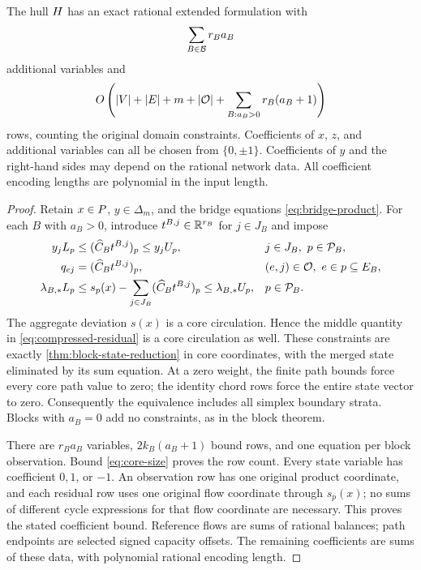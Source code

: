 \begin{theorem}\label{thm:cycle-compression}
The hull $H$ has an exact rational extended formulation with
\begin{equation}\label{eq:initial-variable-count}
 \sum_{B\in\mathcal B}r_Ba_B
\end{equation}
additional variables and
\begin{equation}\label{eq:compression-row-count}
 O\left(|V|+|E|+m+|\mathcal O|
       +\sum_{B:a_B>0}r_B(a_B+1)\right)
\end{equation}
rows, counting the original domain constraints. Coefficients of $x$, $z$,
and additional variables can all be chosen from $\{0,\pm1\}$. Coefficients
of $y$ and the right-hand sides may depend on the rational network data.
All coefficient encoding lengths are polynomial in the input length.
\end{theorem}
\begin{proof}
Retain $x\in P$, $y\in\Delta_m$, and the bridge equations
\eqref{eq:bridge-product}. For each $B$ with $a_B>0$, introduce
$t^{B,j}\in\mathbb R^{r_B}$ for $j\in J_B$ and impose
\begin{align}
 y_jL_p&\le(\widehat C_Bt^{B,j})_p\le y_jU_p,
       &&j\in J_B,\ p\in\mathcal P_B,\label{eq:compressed-state}\\
 q_{ej}&=(\widehat C_Bt^{B,j})_p,
       &&(e,j)\in\mathcal O,\ e\in p\subseteq E_B,\label{eq:compressed-observation}\\
 \lambda_{B,*}L_p&\le s_p(x)-\sum_{j\in J_B}
                      (\widehat C_Bt^{B,j})_p
                    \le\lambda_{B,*}U_p,
       &&p\in\mathcal P_B.\label{eq:compressed-residual}
\end{align}
The aggregate deviation $s(x)$ is a core circulation. Hence the middle
quantity in \eqref{eq:compressed-residual} is a core circulation as well.
These constraints are exactly \cref{thm:block-state-reduction} in core
coordinates, with the merged state eliminated by its sum equation.
At a zero weight, the finite path bounds force every core path value to
zero; the identity chord rows force the entire state vector to zero.
Consequently the equivalence includes all simplex boundary strata. Blocks
with $a_B=0$ add no constraints, as in the block theorem.

There are $r_Ba_B$ variables, $2k_B(a_B+1)$ bound rows, and one equation
per block observation. Bound \eqref{eq:core-size} proves the row count.
Every state variable has coefficient $0,1$, or $-1$. An observation row
has one original product coordinate, and each residual row uses one
original flow coordinate through $s_p(x)$; no sums of different cycle
expressions for that flow coordinate are necessary. This proves the stated
coefficient bound. Reference flows are sums of rational balances; path
endpoints are selected signed capacity offsets. The remaining coefficients
are sums of these data, with polynomial rational encoding length.
\end{proof}

